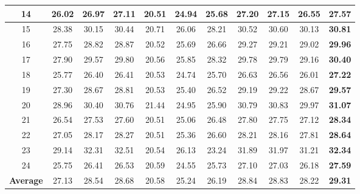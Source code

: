 \begin{table}
\begin{adjustwidth}{-1cm}{}
\begin{center}
\begin{tabular}{|c||c|c|c|c|c|c|c|c|c|c|}
\hline
14& 26.02 & 26.97 & 27.11 & 20.51 & 24.94  & 25.68 & 27.20 & 27.15 & 26.55 & \textbf{27.57}
\\
\hline
15& 28.38 & 30.15 & 30.44 & 20.71 & 26.06 & 28.21 & 30.52 & 30.60 & 30.13 & \textbf{30.81}
\\
\hline
16& 27.75 & 28.82 & 28.87 & 20.52 & 25.69 & 26.66 & 29.27 & 29.21 & 29.02 & \textbf{29.96}
\\
\hline
17& 27.90 & 29.57 & 29.80 & 20.56 & 25.85 & 28.32 & 29.78 & 29.79 & 29.16 & \textbf{30.40}
\\
\hline
18& 25.77 & 26.40 & 26.41 & 20.53 & 24.74 & 25.70 & 26.63 & 26.56 & 26.01 & \textbf{27.22}
\\
\hline
19& 27.30 & 28.67 & 28.81 & 20.53 & 25.40 & 26.52 & 29.19 & 29.22 & 28.67 & \textbf{29.57}
\\
\hline
20& 28.96 & 30.40 & 30.76 & 21.44 & 24.95 & 25.90 & 30.79 & 30.83 & 29.97 & \textbf{31.07}
\\
\hline
21& 26.54 & 27.53 & 27.60 & 20.51 & 25.06 & 26.48 & 27.80 & 27.75 & 27.12 & \textbf{28.34}
\\
\hline
22& 27.05 & 28.17 & 28.27 & 20.51 & 25.36 & 26.60 & 28.21 & 28.16 & 27.81 & \textbf{28.64}
\\
\hline
23& 29.14 & 32.31 & 32.51 & 20.54 & 26.13 & 23.24 & 31.89 & 31.97 & 31.21 & \textbf{32.34}
\\
\hline
24& 25.75 & 26.41 & 26.53 & 20.59 & 24.55 & 25.73 & 27.10 & 27.03 & 26.18 & \textbf{27.59}
\\
\hline
\textbf{Average} 
& 27.13 & 28.54 & 28.68 & 20.58 & 25.24 & 26.19 & 28.84 & 28.83 & 28.22 & \textbf{29.31}
\\
\hline
\end{tabular}
\end{center}
\end{adjustwidth}
\end{table}


